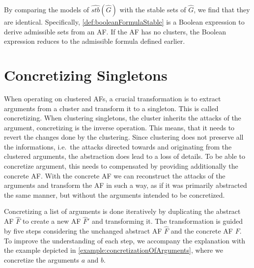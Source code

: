 By comparing the models of $\hat{stb}(\hat{G})$ with the stable sets of $\hat{G}$, we find that they are identical. Specifically, \cref{def:booleanFormulaStable} is a Boolean expression to derive admissible sets from an AF. If the AF has no clusters, the Boolean expression reduces to the admissible formula defined earlier.


\section{Concretizing Singletons}
\label{sec:ConcretizingSingletons}
When operating on clustered AFs, a crucial transformation is to extract arguments from a cluster and transform it to a singleton. This is called concretizing. When clustering singletons, the cluster inherits the attacks of the argument, concretizing is the inverse operation. This means, that it needs to revert the changes done by the clustering. Since clustering does not preserve all the informations, i.e.\ the attacks directed towards and originating from the clustered arguments, the abstraction does lead to a loss of details. To be able to concretize argument, this needs to compensated by providing additionally the concrete AF. With the concrete AF we can reconstruct the attacks of the arguments and transform the AF in such a way, as if it was primarily abstracted the same manner, but without the arguments intended to be concretized.

Concretizing a list of arguments is done iteratively by duplicating the abstract AF $\hat{F}$ to create a new AF $\hat{F}'$ and transforming it. The transformation is guided by five steps considering the unchanged abstract AF $\hat{F}$ and the concrete AF $F$. To improve the understanding of each step, we accompany the explanation with the example depicted in \cref{example:concretizationOfArguments}, where we concretize the arguments $a$ and $b$.

\vspace{0.3cm}

